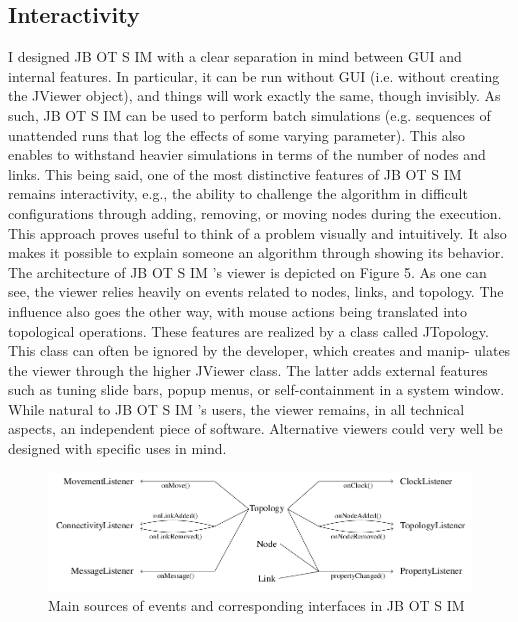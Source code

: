 \subsection{Interactivity}
I designed JB OT S IM with a clear separation in mind between
GUI and internal features. In particular, it can be run without GUI
(i.e. without creating the JViewer object), and things will work
exactly the same, though invisibly. As such, JB OT S IM can be used
to perform batch simulations (e.g. sequences of unattended runs
that log the effects of some varying parameter). This also enables
to withstand heavier simulations in terms of the number of nodes
and links.
This being said, one of the most distinctive features of JB OT S IM
remains interactivity, e.g., the ability to challenge the algorithm in
difficult configurations through adding, removing, or moving nodes
during the execution. This approach proves useful to think of a
problem visually and intuitively. It also makes it possible to explain
someone an algorithm through showing its behavior.
The architecture of JB OT S IM ’s viewer is depicted on Figure 5.
As one can see, the viewer relies heavily on events related to nodes,
links, and topology. The influence also goes the other way, with
mouse actions being translated into topological operations. These
features are realized by a class called JTopology. This class
can often be ignored by the developer, which creates and manip-
ulates the viewer through the higher JViewer class. The latter
adds external features such as tuning slide bars, popup menus, or
self-containment in a system window.
While natural to JB OT S IM ’s users, the viewer remains, in all
technical aspects, an independent piece of software. Alternative
viewers could very well be designed with specific uses in mind.

\begin{figure}[hbtp]
\centering
\includegraphics[scale=1]{screenshot_6.png}
\caption{Main sources of events and corresponding interfaces in JB OT S IM}
\end{figure}
